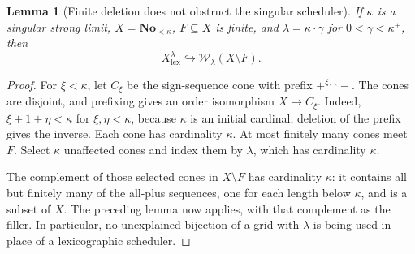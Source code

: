 \documentclass[11pt]{article}
\newtheorem{lemma}[lemma]{Lemma}
\theoremstyle{definition}
\theoremstyle{remark}
\newcommand{\No}{\mathbf{No}}
\newcommand{\WO}{\mathcal W}
\newcommand{\emb}{\hookrightarrow}
\newcommand{\concat}{\mathbin{{}^\frown}}
\begin{document}
\begin{lemma}[Finite deletion does not obstruct the singular scheduler]
\label{swo:cb:new:lem:finite-deletion}
If $\kappa$ is a singular strong limit, $X=\No_{<\kappa}$,
$F\subseteq X$ is finite, and $\lambda=\kappa\cdot\gamma$ for
$0<\gamma<\kappa^+$, then
\[
                   X^\lambda_{\mathrm{lex}}
                         \emb\WO_\lambda(X\setminus F).
\]
\end{lemma}
\begin{proof}
For $\xi<\kappa$, let $C_\xi$ be the sign-sequence cone with prefix
$+^\xi\concat -$.  The cones are disjoint, and prefixing gives an
order isomorphism $X\to C_\xi$.  Indeed,
$\xi+1+\eta<\kappa$ for $\xi,\eta<\kappa$, because $\kappa$ is an
initial cardinal; deletion of the prefix gives the inverse.  Each
cone has cardinality $\kappa$.  At most finitely many cones meet $F$.
Select $\kappa$ unaffected cones and index them by $\lambda$, which
has cardinality $\kappa$.

The complement of those selected cones in $X\setminus F$ has
cardinality $\kappa$: it contains all but finitely many of the
all-plus sequences, one for each length below $\kappa$, and is a
subset of $X$.  The preceding lemma now applies, with that complement
as the filler.  In particular, no unexplained bijection of a grid with
$\lambda$ is being used in place of a lexicographic scheduler.
\end{proof}
\end{document}

